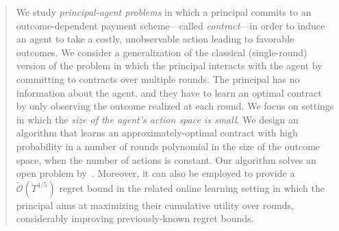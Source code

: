 \begin{abstract}
	We study \emph{principal-agent problems} in which a principal commits to an outcome-dependent payment scheme---called \emph{contract}---in order to induce an agent to take a costly, unobservable action leading to favorable outcomes.
	We consider a generalization of the classical (single-round) version of the problem in which the principal interacts with the agent by committing to contracts over multiple rounds.
	The principal has no information about the agent, and they have to learn an optimal contract by only observing the outcome realized at each round.
	We focus on settings in which the \emph{size of the agent's action space is small}.
	We design an algorithm that learns an approximately-optimal contract with high probability in a number of rounds polynomial in the size of the outcome space, when the number of actions is constant.
	Our algorithm solves an open problem by~\citet{zhu2022sample}.
	Moreover, it can also be employed to provide a $\widetilde{\mathcal{O}}(T^{4/5})$ regret bound in the related online learning setting in which the principal aims at maximizing their cumulative utility over rounds, considerably improving previously-known regret bounds.
\end{abstract}